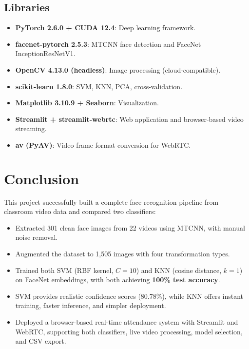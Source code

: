 \documentclass[12pt,a4paper]{article}
\begin{document}
\subsection{Libraries}
\label{subsec:libraries}

\begin{itemize}
    \item \textbf{PyTorch 2.6.0 + CUDA 12.4}: Deep learning framework.
    \item \textbf{facenet-pytorch 2.5.3}: MTCNN face detection and FaceNet InceptionResNetV1.
    \item \textbf{OpenCV 4.13.0 (headless)}: Image processing (cloud-compatible).
    \item \textbf{scikit-learn 1.8.0}: SVM, KNN, PCA, cross-validation.
    \item \textbf{Matplotlib 3.10.9 + Seaborn}: Visualization.
    \item \textbf{Streamlit + streamlit-webrtc}: Web application and browser-based video streaming.
    \item \textbf{av (PyAV)}: Video frame format conversion for WebRTC.
\end{itemize}

\section{Conclusion}
\label{sec:conclusion}

This project successfully built a complete face recognition pipeline from classroom video data and compared two classifiers:

\begin{itemize}
    \item Extracted 301 clean face images from 22 videos using MTCNN, with manual noise removal.
    \item Augmented the dataset to 1,505 images with four transformation types.
    \item Trained both SVM (RBF kernel, $C=10$) and KNN (cosine distance, $k=1$) on FaceNet embeddings, with both achieving \textbf{100\% test accuracy}.
    \item SVM provides realistic confidence scores (80.78\%), while KNN offers instant training, faster inference, and simpler deployment.
    \item Deployed a browser-based real-time attendance system with Streamlit and WebRTC, supporting both classifiers, live video processing, model selection, and CSV export.
\end{itemize}
\end{document}
